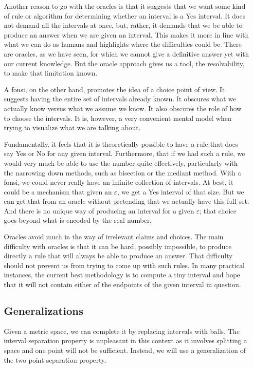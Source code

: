 \documentclass[12pt]{article}
\theoremstyle{remark}
\begin{document}
Another reason to go with the oracles is that it suggests that we want some kind of rule or algorithm for determining whether an interval is a Yes interval. It does not demand all the intervals at once, but, rather, it demands that we be able to produce an answer when we are given an interval. This makes it more in line with what we can do as humans and highlights where the difficulties could be. There are oracles, as we have seen, for which we cannot give a definitive answer yet with our current knowledge. But the oracle approach gives us a tool, the resolvability, to make that limitation known. 

A fonsi, on the other hand, promotes the idea of a choice point of view. It suggests having the entire set of intervals already known. It obscures what we actually know versus what we assume we know. It also obscures the role of how to choose the intervals. It is, however, a very convenient mental model when trying to visualize what we are talking about. 

Fundamentally, it feels that it is theoretically possible to have a rule that does say Yes or No for any given interval. Furthermore, that if we had such a rule, we would very much be able to use the number quite effectively, particularly with the narrowing down methods, such as bisection or the mediant method. With a fonsi, we could never really have an infinite collection of intervals. At best, it could be a mechanism that given an $\varepsilon$, we get a Yes interval of that size. But we can get that from an oracle without pretending that we actually have this full set. And there is no unique way of producing an interval for a given $\varepsilon$; that choice goes beyond what is encoded by the real number. 

Oracles avoid much in the way of irrelevant claims and choices. The main difficulty with oracles is that it can be hard, possibly impossible, to produce directly a rule that will always be able to produce an answer. That difficulty should not prevent us from trying to come up with such rules. In many practical instances, the current best methodology is to compute a tiny interval and hope that it will not contain either of the endpoints of the given interval in question. 

\subsection{Generalizations}

Given a metric space, we can complete it by replacing intervals with balls. The interval separation property is unpleasant in this context as it involves splitting a space and one point will not be sufficient. Instead, we will use a generalization of the two point separation property. 
\end{document}
